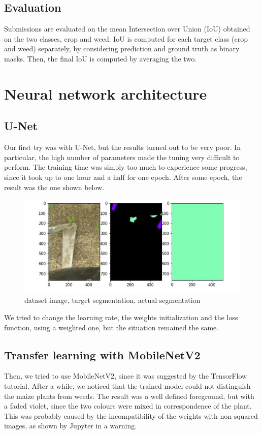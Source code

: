 \documentclass[12pt,a4paper]{report}
\begin{document}
	\section{Evaluation}
Submissions are evaluated on the mean Intersection over Union (IoU) obtained on the two classes, crop and weed. IoU is computed for each target class (crop and weed) separately, by considering prediction and ground truth as binary masks. Then, the final IoU is computed by averaging the two.


	\chapter{Neural network architecture}		
		\section{U-Net}
Our first try was with U-Net, but the results turned out to be very poor. In particular, the high number of parameters made the tuning very difficult to perform. The training time was simply too much to experience some progress, since it took up to one hour and a half for one epoch. After some epoch, the result was the one shown below. 
\begin{figure}[H]
	\includegraphics[scale = .75, center]{U_Net}
	\caption{dataset image, target segmentation, actual segmentation}
\end{figure}
	
We tried to change the learning rate, the weights initialization and the loss function, using a weighted one, but the situation remained the same.	
		
		\section{Transfer learning with MobileNetV2}
Then, we tried to use MobileNetV2, since it was suggested by the TensorFlow tutorial. After a while, we noticed that the trained model could not distinguish the maize plants from weeds. The result was a well defined foreground, but with a faded violet, since the two colours were mixed in correspondence of the plant.  This was probably caused by the incompatibility of the weights with non-squared images, as shown by Jupyter in a warning. 
	
\end{document}
